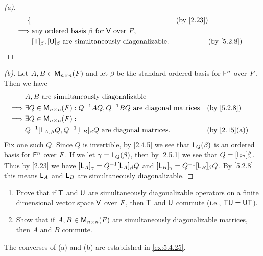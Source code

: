 \begin{proof}[(a)]
\begin{align*}
\begin{dcases}
               \end{dcases} &  & \by{2.23}                    \\
    \implies & \text{any ordered basis } \beta \text{ for } \V \text{ over } \F,                                                                                                                                                                                 \\
             & [\T]_{\beta}, [\U]_{\beta} \text{ are simultaneously diagonalizable}.                                                                                                                                                             &  & \by{5.2.8}
  \end{align*}
\end{proof}

\begin{proof}[(b)]
  Let \(A, B \in \ms[n][n][\F]\) and let \(\beta\) be the standard ordered basis for \(\mathsf{F}^n\) over \(\mathit{F}\).
  Then we have
  \begin{align*}
             & A, B \text{ are simultaneously diagonalizable}                                                       \\
    \implies & \exists Q \in \ms[n][n][\F] : Q^{-1} A Q, Q^{-1} B Q \text{ are diagonal matrices} &  & \by{5.2.8}   \\
    \implies & \exists Q \in \ms[n][n][\F] :                                                                        \\
             & Q^{-1} [\L_A]_{\beta} Q, Q^{-1} [\L_B]_{\beta} Q \text{ are diagonal matrices}.    &  & \by{2.15}[a]
  \end{align*}
  Fix one such \(Q\).
  Since \(Q\) is invertible, by \cref{2.4.5} we see that \(\mathsf{L}_Q(\beta)\) is an ordered basis for \(\mathsf{F}^n\) over \(\mathit{F}\).
  If we let \(\gamma = \mathsf{L}_Q(\beta)\), then by \cref{2.5.1} we see that \(Q = [\IT[\vs{F}^n]]_{\gamma}^{\beta}\).
  Thus by \cref{2.23} we have \([\mathsf{L}_A]_{\gamma} = Q^{-1} [\mathsf{L}_A]_{\beta} Q\) and \([\mathsf{L}_B]_{\gamma} = Q^{-1} [\mathsf{L}_B]_{\beta} Q\).
  By \cref{5.2.8} this means \(\mathsf{L}_A\) and \(\mathsf{L}_B\) are simultaneously diagonalizable.
\end{proof}

\begin{ex}\label{ex:5.2.18}
  \begin{enumerate}
    \item Prove that if \(\mathsf{T}\) and \(\mathsf{U}\) are simultaneously diagonalizable operators on a finite dimensional vector space \(\mathsf{V}\) over \(\mathit{F}\), then \(\mathsf{T}\) and \(\mathsf{U}\) commute (i.e., \(\mathsf{T} \mathsf{U} = \mathsf{U} \mathsf{T}\)).
    \item Show that if \(A, B \in \ms[n][n][\F]\) are simultaneously diagonalizable matrices, then \(A\) and \(B\) commute.
  \end{enumerate}
  The converses of (a) and (b) are established in \cref{ex:5.4.25}.
\end{ex}

